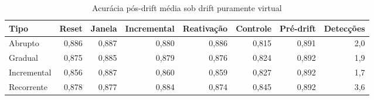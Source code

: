 \begin{table}[htbp]
\centering
\small
\caption{Acurácia pós-drift média sob drift puramente virtual}
\label{tab:drift-virtual}
\begin{adjustbox}{max width=\textwidth}
\begin{tabular}{lrrrrrrr}
\toprule
Tipo & Reset & Janela & Incremental & Reativação & Controle & Pré-drift & Detecções \\
\midrule
Abrupto & 0,886 & 0,887 & 0,880 & 0,886 & 0,815 & 0,891 & 2,0 \\
Gradual & 0,875 & 0,885 & 0,879 & 0,876 & 0,824 & 0,892 & 1,9 \\
Incremental & 0,856 & 0,887 & 0,860 & 0,859 & 0,827 & 0,892 & 1,7 \\
Recorrente & 0,878 & 0,877 & 0,884 & 0,874 & 0,845 & 0,892 & 3,6 \\
\bottomrule
\end{tabular}
\end{adjustbox}
\par\vspace{2pt}{\footnotesize Médias sobre severidades, classificadores e 10 repetições. Detecções: média por stream. Friedman: $\chi^2$ = 198,7, $p$ $<$ 0,001.}
\end{table}
